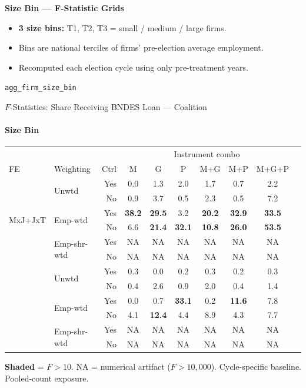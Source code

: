 \documentclass[aspectratio=169,10pt]{beamer}
\newcommand{\fpass}[1]{\cellcolor{pass}\textbf{#1}}
\begin{document}
\begin{frame}[plain]
\begin{center}
{\Large\textbf{Size Bin --- F-Statistic Grids}}\\[0.5em]
\end{center}
\small
\begin{itemize}
\item \textbf{3 size bins:} T1, T2, T3 = small / medium / large firms.
\item Bins are national terciles of firms' pre-election average employment.
\item Recomputed each election cycle using only pre-treatment years.
\end{itemize}
\vfill
\begin{center}
{\scriptsize \texttt{agg\_firm\_size\_bin}}
\end{center}
\end{frame}

\begin{frame}[t]{$F$-Statistics: Share Receiving BNDES Loan --- Coalition}
\framesubtitle{Size Bin}
\begin{center}
\footnotesize
\setlength{\tabcolsep}{3.5pt}
\renewcommand{\arraystretch}{1.05}
\begin{tabular}{@{}llrccccccc@{}}
\toprule
 & & & \multicolumn{6}{c}{Instrument combo} \\
\cmidrule(l{2pt}r{2pt}){4-9}
FE & Weighting & Ctrl & M & G & P & M+G & M+P & M+G+P \\
\midrule
  \multirow{6}{*}{MxJ+JxT} & \multirow{2}{*}{Unwtd} & Yes & 0.0 & 1.3 & 2.0 & 1.7 & 0.7 & 2.2 \\
   &  & No & 0.9 & 3.7 & 0.5 & 2.3 & 0.5 & 7.2 \\
   & \multirow{2}{*}{Emp-wtd} & Yes & \fpass{38.2} & \fpass{29.5} & 3.2 & \fpass{20.2} & \fpass{32.9} & \fpass{33.5} \\
   &  & No & 6.6 & \fpass{21.4} & \fpass{32.1} & \fpass{10.8} & \fpass{26.0} & \fpass{53.5} \\
   & \multirow{2}{*}{Emp-shr-wtd} & Yes & NA & NA & NA & NA & NA & NA \\
   &  & No & NA & NA & NA & NA & NA & NA \\
\addlinespace[5pt]
  \multirow{6}{*}{MxJ+MxT} & \multirow{2}{*}{Unwtd} & Yes & 0.3 & 0.0 & 0.2 & 0.3 & 0.2 & 0.3 \\
   &  & No & 0.4 & 2.6 & 0.9 & 2.0 & 0.4 & 1.4 \\
   & \multirow{2}{*}{Emp-wtd} & Yes & 0.0 & 0.7 & \fpass{33.1} & 0.2 & \fpass{11.6} & 7.8 \\
   &  & No & 4.1 & \fpass{12.4} & 4.4 & 8.9 & 4.3 & 7.7 \\
   & \multirow{2}{*}{Emp-shr-wtd} & Yes & NA & NA & NA & NA & NA & NA \\
   &  & No & NA & NA & NA & NA & NA & NA \\
\bottomrule
\end{tabular}
\end{center}
{\scriptsize \colorbox{pass}{\textbf{Shaded}} = $F>10$. NA = numerical artifact ($F>10{,}000$). Cycle-specific baseline. Pooled-count exposure.}
\end{frame}
\end{document}
